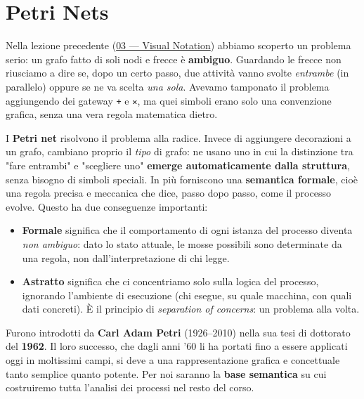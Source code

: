 \chapter{\texorpdfstring{Petri Nets}{Petri Nets}}
\label{ch:04}

Nella lezione precedente (\hyperref[ch:03]{03 — Visual Notation}) abbiamo scoperto un problema serio: un grafo fatto di soli nodi e frecce è \textbf{ambiguo}. Guardando le frecce non riusciamo a dire se, dopo un certo passo, due attività vanno svolte \emph{entrambe} (in parallelo) oppure se ne va scelta \emph{una sola}. Avevamo tamponato il problema aggiungendo dei gateway \texttt{+} e \texttt{✕}, ma quei simboli erano solo una convenzione grafica, senza una vera regola matematica dietro.

I \textbf{Petri net} risolvono il problema alla radice. Invece di aggiungere decorazioni a un grafo, cambiano proprio il \emph{tipo} di grafo: ne usano uno in cui la distinzione tra "fare entrambi" e "scegliere uno" \textbf{emerge automaticamente dalla struttura}, senza bisogno di simboli speciali. In più forniscono una \textbf{semantica formale}, cioè una regola precisa e meccanica che dice, passo dopo passo, come il processo evolve. Questo ha due conseguenze importanti:

\begin{itemize}
\item \textbf{Formale} significa che il comportamento di ogni istanza del processo diventa \emph{non ambiguo}: dato lo stato attuale, le mosse possibili sono determinate da una regola, non dall'interpretazione di chi legge.
\item \textbf{Astratto} significa che ci concentriamo solo sulla logica del processo, ignorando l'ambiente di esecuzione (chi esegue, su quale macchina, con quali dati concreti). È il principio di \emph{separation of concerns}: un problema alla volta.
\end{itemize}

Furono introdotti da \textbf{Carl Adam Petri} (1926–2010) nella sua tesi di dottorato del \textbf{1962}. Il loro successo, che dagli anni '60 li ha portati fino a essere applicati oggi in moltissimi campi, si deve a una rappresentazione grafica e concettuale tanto semplice quanto potente. Per noi saranno la \textbf{base semantica} su cui costruiremo tutta l'analisi dei processi nel resto del corso.

